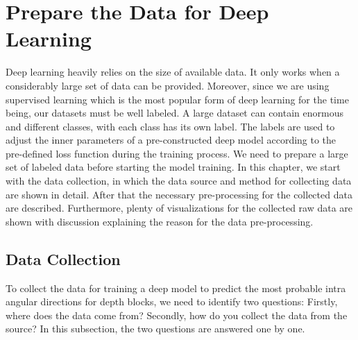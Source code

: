 \chapter{Prepare the Data for Deep Learning}\label{ch:chapter3} %

Deep learning heavily relies on the size of available data.
It only works when a considerably large set of data can be provided.
Moreover, since we are using supervised learning which is the most
popular form of deep learning for the time being, our datasets
must be well labeled.
A large dataset can contain enormous and different classes,
with each class has its own label.
The labels are used to adjust the inner parameters of a pre-constructed
deep model according to the pre-defined loss function during the training
process.
We need to prepare a large set of labeled data before starting the
model training.
In this chapter, we start with the data collection, in which the data source
and method for collecting data are shown in detail.
After that the necessary pre-processing for the collected data are described.
Furthermore, plenty of visualizations for the collected raw data are shown with
discussion explaining the reason for the data pre-processing.

\section{Data Collection}\label{sec:data-collection}
To collect the data for training a deep model to predict the most probable
intra angular directions for depth blocks, we need to identify two questions:
Firstly, where does the data come from?
Secondly, how do you collect the data from the source?
In this subsection, the two questions are answered one by one.

